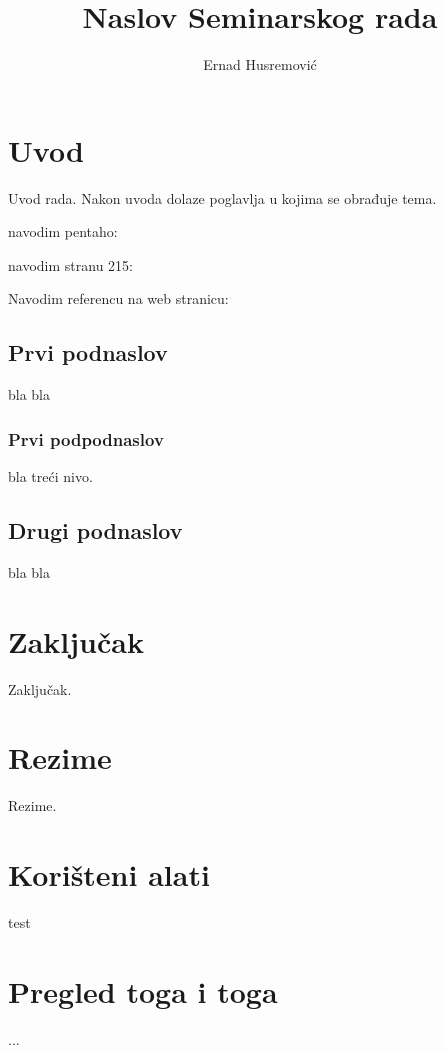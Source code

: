 \documentclass[times, utf8, seminar]{fit}
\begin{document}
\title{Naslov Seminarskog rada}

\author{Ernad Husremović}


\maketitle

\tableofcontents

\chapter{Uvod}
Uvod rada. Nakon uvoda dolaze poglavlja u kojima se obrađuje tema.

navodim pentaho: \cite{pentaho32}

navodim stranu 215: \cite[str.~215]{pentaho32}

Navodim referencu na web stranicu: \citep{website:fermentas-lambda}

\section{Prvi podnaslov}

bla bla

\subsection{Prvi podpodnaslov}

bla treći nivo.

\section{Drugi podnaslov}

bla bla



\chapter{Zaključak}
Zaključak.




\chapter{Rezime}
Rezime.

\appendix

\chapter{Korišteni alati}

test

\chapter{Pregled toga i toga}

...
\end{document}

